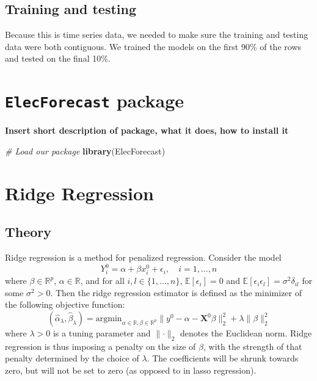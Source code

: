 \documentclass[
]{article}
\newenvironment{Shaded}{\begin{snugshade}}{\end{snugshade}}
\newcommand{\CommentTok}[1]{\textcolor[rgb]{0.56,0.35,0.01}{\textit{#1}}}
\newcommand{\FunctionTok}[1]{\textcolor[rgb]{0.13,0.29,0.53}{\textbf{#1}}}
\newcommand{\NormalTok}[1]{#1}
\begin{document}
\hypertarget{training-and-testing}{%
\subsection{Training and testing}\label{training-and-testing}}

Because this is time series data, we needed to make sure the training
and testing data were both contiguous. We trained the models on the
first 90\% of the rows and tested on the final 10\%.

\hypertarget{elecforecast-package}{%
\section{\texorpdfstring{\texttt{ElecForecast}
package}{ElecForecast package}}\label{elecforecast-package}}

\textbf{Insert short description of package, what it does, how to
install it}

\begin{Shaded}
\begin{Highlighting}[]
\CommentTok{\# Load our package}
\FunctionTok{library}\NormalTok{(ElecForecast)}
\end{Highlighting}
\end{Shaded}

\hypertarget{ridge-regression}{%
\section{Ridge Regression}\label{ridge-regression}}

\hypertarget{theory}{%
\subsection{Theory}\label{theory}}

Ridge regression is a method for penalized regression. Consider the
model \[Y_i^0 = \alpha + \beta x_i^0 + \epsilon_i, \quad  i = 1,..., n\]
where \(\beta \in \mathbb{R}^p\), \(\alpha \in \mathbb{R}\), and for all
\(i, l \in \{1, ..., n\}\), \(\mathbb{E}[\epsilon_i] = 0\) and
\(\mathbb{E}[\epsilon_i \epsilon_l] = \sigma^2 \delta_{il}\) for some
\(\sigma^2 > 0\). Then the ridge regression estimator is defined as the
minimizer of the following objective function:
\[(\hat{\alpha}_\lambda, \hat{\beta}_\lambda) = \mathrm{argmin}_{\alpha \in \mathbb{R}, \beta \in \mathbb{R}^p} \lVert y^0 - \alpha - \boldsymbol{X}^0 \beta \rVert^2_2 + \lambda \lVert \beta \rVert^2_2\]
where \(\lambda > 0\) is a tuning parameter and
\(\lVert \cdot \rVert_2\) denotes the Euclidean norm. Ridge regression
is thus imposing a penalty on the size of \(\beta\), with the strength
of that penalty determined by the choice of \(\lambda\). The
coefficients will be shrunk towards zero, but will not be set to zero
(as opposed to in lasso regression).
\end{document}
